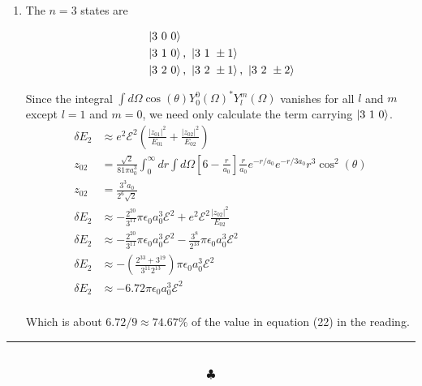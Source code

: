\documentclass[]{article}
\begin{document}
\begin{enumerate}[1)]
\begin{enumerate}[a)]
\end{enumerate}

\item The $n=3$ states are

\begin{equation}
\begin{split}
& \ket{3 \text{ }0\text{ } 0} \\
&\ket{3 \text{ }1\text{ } 0} \text{,	} \ket{3 \text{ }1\text{ } \pm 1} \\
&\ket{3 \text{ }2\text{ } 0} \text{,	} \ket{3 \text{ }2\text{ } \pm 1} \text{,	} \ket{3 \text{ }2\text{ } \pm 2} \\
\end{split}
\end{equation}

Since the integral $\int d\Omega \cos(\theta) Y_0^0(\Omega)^*Y_l^m(\Omega)$ vanishes for all $l$ and $m$ except $l=1$ and $m=0$, we need only calculate the term carrying $\ket{3 \text{ }1\text{ } 0} $. \\

\begin{equation}
\begin{split}
\delta E_2 & \approx e^2 \mathscr{E}^2 \left(   \frac{|z_{01}|^2}{E_{01}} + \frac{|z_{02}|^2}{E_{02}} \right) \\
z_{02} & = \frac{\sqrt{2}}{81 \pi a_0^3} \int_{0}^{\infty}dr\int d\Omega \left[ 6-\frac{r}{a_0} \right]\frac{r}{a_0}e^{-r/a_0} e^{-r/3a_0} r^3\cos^2(\theta) \\
z_{02} & = \frac{3^3a_0}{2^6\sqrt{2}} \\ 
\delta E_2 & \approx -\frac{2^{20}}{3^{11}}\pi \epsilon_0 a_0^3 \mathscr{E}^2 +  e^2 \mathscr{E}^2 \frac{|z_{02}|^2}{E_{02}}  \\
\delta E_2 & \approx -\frac{2^{20}}{3^{11}}\pi \epsilon_0 a_0^3 \mathscr{E}^2 - \frac{3^8}{2^{13}} \pi\epsilon_0a_0^3\mathscr{E}^2   \\ 
\delta E_2 & \approx -\left(  \frac{2^{33} + 3^{19}}{3^{11}2^{13} }\right)\pi\epsilon_0a_0^3\mathscr{E}^2 \\
\delta E_2 & \approx - 6.72 \pi\epsilon_0a_0^3\mathscr{E}^2 \\
\end{split}
\end{equation}

Which is about $6.72/9 \approx 74.67 \%$ of the value in equation (22) in the reading. 

\end{enumerate}
\noindent\rule{15cm}{0.4pt} \\
$$\clubsuit$$
\end{document}
